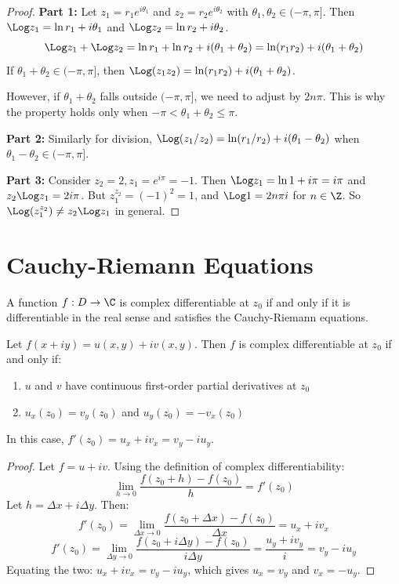 \begin{proof}
\textbf{Part 1:} Let $z_1 = r_1 e^{i\theta_1}$ and $z_2 = r_2 e^{i\theta_2}$ with $\theta_1, \theta_2 \in (-\pi, \pi]$.
Then $\Log z_1 = \ln r_1 + i\theta_1$ and $\Log z_2 = \ln r_2 + i\theta_2$.
\[ \Log z_1 + \Log z_2 = \ln r_1 + \ln r_2 + i(\theta_1 + \theta_2) = \ln(r_1 r_2) + i(\theta_1 + \theta_2) \]
If $\theta_1 + \theta_2 \in (-\pi, \pi]$, then $\Log(z_1 z_2) = \ln(r_1 r_2) + i(\theta_1 + \theta_2)$.

However, if $\theta_1 + \theta_2$ falls outside $(-\pi, \pi]$, we need to adjust by $2n\pi$.
This is why the property holds only when $-\pi < \theta_1 + \theta_2 \leq \pi$.

\textbf{Part 2:} Similarly for division, $\Log(z_1/z_2) = \ln(r_1/r_2) + i(\theta_1 - \theta_2)$ when $\theta_1 - \theta_2 \in (-\pi, \pi]$.

\textbf{Part 3:} Consider $z_2 = 2, z_1 = e^{i\pi} = -1$.
Then $\Log z_1 = \ln 1 + i\pi = i\pi$ and $z_2 \Log z_1 = 2i\pi$.
But $z_1^{z_2} = (-1)^2 = 1$, and $\Log 1 = 2n\pi i$ for $n \in \Z$.
So $\Log(z_1^{z_2}) \neq z_2 \Log z_1$ in general.
\end{proof}

\section{Cauchy-Riemann Equations}
\label{sec:cauchy-riemann}

A function $f: D \to \C$ is complex differentiable at $z_0$ if and only if it is differentiable in the real sense and satisfies the Cauchy-Riemann equations.

\begin{theorem}
\label{thm:cauchy-riemann}
Let $f(x + iy) = u(x, y) + i v(x, y)$. Then $f$ is complex differentiable at $z_0$ if and only if:
\begin{enumerate}
\item $u$ and $v$ have continuous first-order partial derivatives at $z_0$
\item $u_x(z_0) = v_y(z_0)$ and $u_y(z_0) = -v_x(z_0)$
\end{enumerate}
In this case, $f'(z_0) = u_x + i v_x = v_y - i u_y$.
\end{theorem}

\begin{proof}
Let $f = u + iv$. Using the definition of complex differentiability:
\[ \lim_{h \to 0} \frac{f(z_0 + h) - f(z_0)}{h} = f'(z_0) \]
Let $h = \Delta x + i \Delta y$. Then:
\[ f'(z_0) = \lim_{\Delta x \to 0} \frac{f(z_0 + \Delta x) - f(z_0)}{\Delta x} = u_x + i v_x \]
\[ f'(z_0) = \lim_{\Delta y \to 0} \frac{f(z_0 + i \Delta y) - f(z_0)}{i \Delta y} = \frac{u_y + i v_y}{i} = v_y - i u_y \]
Equating the two: $u_x + i v_x = v_y - i u_y$, which gives $u_x = v_y$ and $v_x = -u_y$.
\end{proof}

